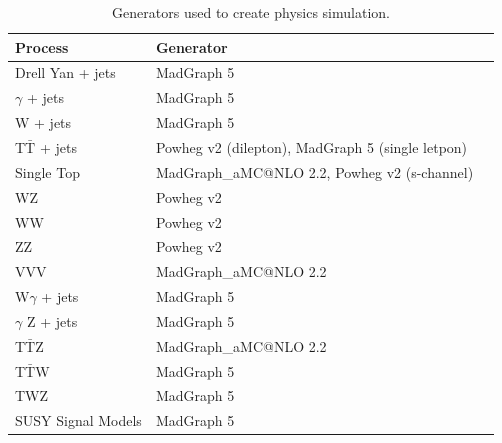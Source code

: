   \begin{table}[htb]
    \begin{center}
      \caption{\label{tab:mc_generators} Generators used to create physics simulation.}
      \begin{tabular}{l|l|c}  
        \hline
        \hline
        Process                    & Generator                                        \\
        \hline
        Drell Yan + jets           & MadGraph 5                                       \\
        $\gamma$ + jets            & MadGraph 5                                       \\
        W + jets                   & MadGraph 5                                       \\
        T$\bar{\text{T}}$ + jets   & Powheg v2 (dilepton), MadGraph 5 (single letpon) \\
        Single Top                 & MadGraph\_aMC@NLO 2.2, Powheg v2 (s-channel)     \\
        WZ                         & Powheg v2                                        \\
        WW                         & Powheg v2                                        \\
        ZZ                         & Powheg v2                                        \\
        VVV                        & MadGraph\_aMC@NLO 2.2                            \\
        W$\gamma$ + jets           & MadGraph 5                                       \\
        $\gamma$ Z + jets          & MadGraph 5                                       \\
        T$\bar{\text{T}}$Z         & MadGraph\_aMC@NLO 2.2                            \\
        T$\bar{\text{T}}$W         & MadGraph 5                                       \\
        TWZ                        & MadGraph 5                                       \\
        \hline
        SUSY Signal Models         & MadGraph 5                                       \\
        \hline
        \hline
      \end{tabular}
    \end{center}
  \end{table}

